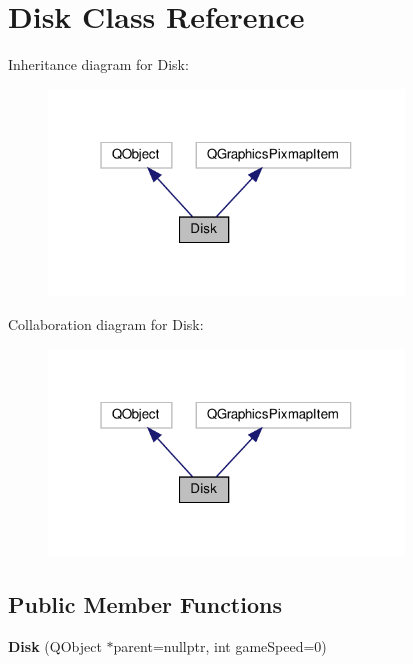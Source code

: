 \hypertarget{classDisk}{}\section{Disk Class Reference}
\label{classDisk}


Inheritance diagram for Disk\+:
\nopagebreak
\begin{figure}[H]
\begin{center}
\leavevmode
\includegraphics[width=268pt]{classDisk__inherit__graph}
\end{center}
\end{figure}


Collaboration diagram for Disk\+:
\nopagebreak
\begin{figure}[H]
\begin{center}
\leavevmode
\includegraphics[width=268pt]{classDisk__coll__graph}
\end{center}
\end{figure}
\subsection*{Public Member Functions}
\begin{DoxyCompactItemize}
\item 
\mbox{\label{classDisk_a18d1c057a8aa391d3b1df800aae2f87b}} 
{\bfseries Disk} (Q\+Object $\ast$parent=nullptr, int game\+Speed=0)
\end{DoxyCompactItemize}
